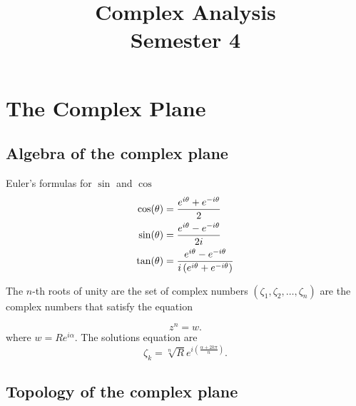 \documentclass{report}
\title{\Huge{Complex Analysis}\\Semester 4}
\author{}
\date{}
\begin{document}
\maketitle
\newpage%
\tableofcontents
\pagebreak

\chapter{The Complex Plane}
\section{Algebra of the complex plane}

\begin{figure}[h]
	\centering
\end{figure}

Euler’s formulas for $\sin$ and $\cos$
\begin{align*}
	\cos(\theta) & = \frac{e^{i\theta} + e^{-i\theta}}{2}                                 \\
	\sin(\theta) & = \frac{e^{i\theta} - e^{-i\theta}}{2i}                                \\
	\tan(\theta) & = \frac{e^{i\theta} - e^{-i\theta}}{i\left(e^{i\theta}+e^{-i\theta}\right)}
\end{align*}

The $n$-th roots of unity are the set of complex numbers $(\zeta_1,\zeta_2,\dots,\zeta_n)$ are the complex numbers that satisfy the equation

\[
	z^n = w
	.\]
where $w=Re^{i\alpha}$. The solutions equation are
\[
	\zeta_k = \sqrt[n]{R} e^{i\left( \frac{\alpha + 2k\pi}{n} \right)}
	.\]

\section{Topology of the complex plane}
\end{document}
